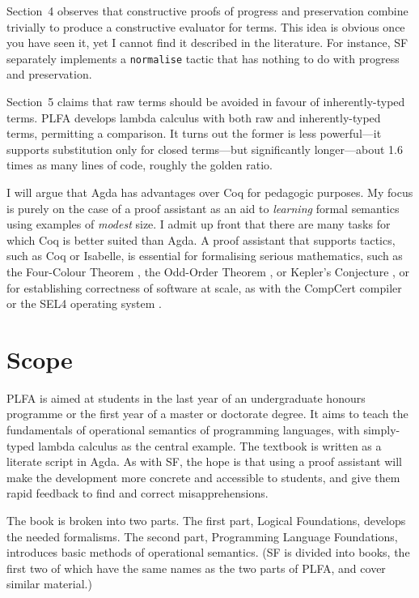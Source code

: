 \documentclass[preprint,authoryear]{elsarticle}
\begin{document}
Section~4 observes that constructive proofs of progress and
preservation combine trivially to produce a constructive evaluator for
terms.  This idea is obvious once you have seen it, yet I cannot
find it described in the literature.  For instance, SF separately
implements a \texttt{normalise} tactic that has nothing to do with
progress and preservation.

Section~5 claims that raw terms should be avoided in favour of
inherently-typed terms.  PLFA develops lambda calculus with both raw
and inherently-typed terms, permitting a comparison.  It turns out the
former is less powerful---it supports substitution only for closed
terms---but significantly longer---about 1.6 times as many lines of code,
roughly the golden ratio.

I will argue that Agda has advantages over Coq for
pedagogic purposes.  My focus is purely on the case of a proof assistant
as an aid to \emph{learning} formal semantics using examples of
\emph{modest} size.  I admit up front that
there are many tasks for which Coq is better suited than Agda.
A proof assistant that supports tactics, such as Coq or Isabelle,
is essential for formalising serious mathematics,
such as the Four-Colour Theorem \citep{Gonthier-2008},
the Odd-Order Theorem \citep{Gonthier-et-al-2013},
or Kepler's Conjecture \citep{Hales-et-al-2017},
or for establishing correctness of software at scale,
as with the CompCert compiler \citep{Leroy-2009,Kastner-et-al-2017}
or the SEL4 operating system \citep{Klein-2009,O'Connor-2016}.

\section{Scope}

PLFA is aimed at students in the last year of an undergraduate
honours programme or the first year of a master or doctorate degree.
It aims to teach the fundamentals of operational semantics of
programming languages, with simply-typed lambda calculus as the
central example.  The textbook is written as a literate script in Agda.
As with SF, the hope is that using
a proof assistant will make the development more concrete
and accessible to students, and give them rapid feedback to find
and correct misapprehensions.

The book is broken into two parts. The first part, Logical Foundations,
develops the needed formalisms.  The second part, Programming Language
Foundations, introduces basic methods of operational semantics.
(SF is divided into books, the first two of which have the same names
as the two parts of PLFA, and cover similar material.)
\end{document}
